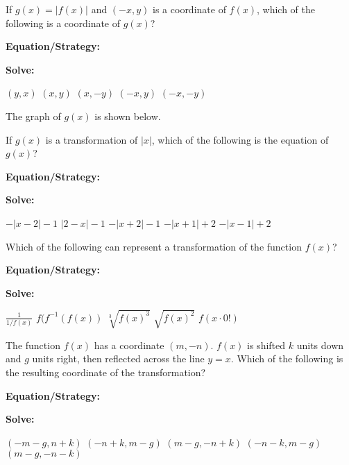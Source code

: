 \vfill
\newpage
\begin{multicols*}{2}
\begin{outline}[enumerate]
\medium

\1 If $g(x)=|f(x)|$ and $(-x,y)$ is a coordinate of $f(x)$, which of the following is a coordinate of $g(x)$?

\bigskip
\textbf{Equation/Strategy:} \hrulefill

\bigskip
\textbf{Solve:}

\vfill
\2 $(y,x)$
\2 $(x,y)$
\2 $(x,-y)$
\2 $(-x,y)$
\2 $(-x,-y)$

\midline

\1 The graph of $g(x)$ is shown below.


If $g(x)$ is a transformation of $|x|$, which of the following is the equation of $g(x)$?

\bigskip
\textbf{Equation/Strategy:} \hrulefill

\bigskip
\textbf{Solve:}

\vfill
\2 $-|x-2|-1$
\2 $|2-x|-1$
\2 $-|x+2|-1$
\2 $-|x+1|+2$
\2 $-|x-1|+2$

\columnbreak
\advanced

\1 Which of the following can represent a transformation of the function $f(x)$?

\bigskip
\textbf{Equation/Strategy:} \hrulefill

\bigskip
\textbf{Solve:}

\vfill
\2 $\frac{1}{1/f(x)}$
\2 $f(f^{-1}(f(x))$
\2 $\sqrt[3]{f(x)^3}$
\2 $\sqrt{f(x)^2}$
\2 $f(x\cdot0!)$

\midline

\1 The function $f(x)$ has a coordinate $(m,-n)$. $f(x)$ is shifted $k$ units down and $g$ units right, then reflected across the line $y=x$. Which of the following is the resulting coordinate of the transformation?

\bigskip
\textbf{Equation/Strategy:}

\bigskip
\textbf{Solve:}

\vfill
\2 $(-m-g,n+k)$
\2 $(-n+k,m-g)$
\2 $(m-g,-n+k)$
\2 $(-n-k,m-g)$
\2 $(m-g,-n-k)$
\end{outline}
\end{multicols*}